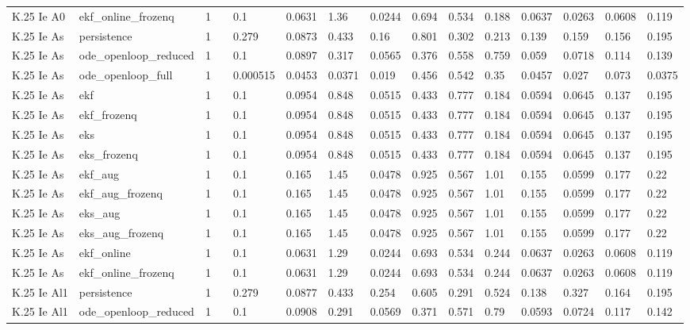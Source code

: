 \begin{table}[t]
\begin{tabular}{lllllllllllllll}
K.25 Ie A0 & ekf\_online\_frozenq & 1 &  & 0.1 & 0.0631 & 1.36 & 0.0244 & 0.694 & 0.534 & 0.188 & 0.0637 & 0.0263 & 0.0608 & 0.119 \\
K.25 Ie As & persistence & 1 &  & 0.279 & 0.0873 & 0.433 & 0.16 & 0.801 & 0.302 & 0.213 & 0.139 & 0.159 & 0.156 & 0.195 \\
K.25 Ie As & ode\_openloop\_reduced & 1 &  & 0.1 & 0.0897 & 0.317 & 0.0565 & 0.376 & 0.558 & 0.759 & 0.059 & 0.0718 & 0.114 & 0.139 \\
K.25 Ie As & ode\_openloop\_full & 1 &  & 0.000515 & 0.0453 & 0.0371 & 0.019 & 0.456 & 0.542 & 0.35 & 0.0457 & 0.027 & 0.073 & 0.0375 \\
K.25 Ie As & ekf & 1 &  & 0.1 & 0.0954 & 0.848 & 0.0515 & 0.433 & 0.777 & 0.184 & 0.0594 & 0.0645 & 0.137 & 0.195 \\
K.25 Ie As & ekf\_frozenq & 1 &  & 0.1 & 0.0954 & 0.848 & 0.0515 & 0.433 & 0.777 & 0.184 & 0.0594 & 0.0645 & 0.137 & 0.195 \\
K.25 Ie As & eks & 1 &  & 0.1 & 0.0954 & 0.848 & 0.0515 & 0.433 & 0.777 & 0.184 & 0.0594 & 0.0645 & 0.137 & 0.195 \\
K.25 Ie As & eks\_frozenq & 1 &  & 0.1 & 0.0954 & 0.848 & 0.0515 & 0.433 & 0.777 & 0.184 & 0.0594 & 0.0645 & 0.137 & 0.195 \\
K.25 Ie As & ekf\_aug & 1 &  & 0.1 & 0.165 & 1.45 & 0.0478 & 0.925 & 0.567 & 1.01 & 0.155 & 0.0599 & 0.177 & 0.22 \\
K.25 Ie As & ekf\_aug\_frozenq & 1 &  & 0.1 & 0.165 & 1.45 & 0.0478 & 0.925 & 0.567 & 1.01 & 0.155 & 0.0599 & 0.177 & 0.22 \\
K.25 Ie As & eks\_aug & 1 &  & 0.1 & 0.165 & 1.45 & 0.0478 & 0.925 & 0.567 & 1.01 & 0.155 & 0.0599 & 0.177 & 0.22 \\
K.25 Ie As & eks\_aug\_frozenq & 1 &  & 0.1 & 0.165 & 1.45 & 0.0478 & 0.925 & 0.567 & 1.01 & 0.155 & 0.0599 & 0.177 & 0.22 \\
K.25 Ie As & ekf\_online & 1 &  & 0.1 & 0.0631 & 1.29 & 0.0244 & 0.693 & 0.534 & 0.244 & 0.0637 & 0.0263 & 0.0608 & 0.119 \\
K.25 Ie As & ekf\_online\_frozenq & 1 &  & 0.1 & 0.0631 & 1.29 & 0.0244 & 0.693 & 0.534 & 0.244 & 0.0637 & 0.0263 & 0.0608 & 0.119 \\
K.25 Ie Al1 & persistence & 1 &  & 0.279 & 0.0877 & 0.433 & 0.254 & 0.605 & 0.291 & 0.524 & 0.138 & 0.327 & 0.164 & 0.195 \\
K.25 Ie Al1 & ode\_openloop\_reduced & 1 &  & 0.1 & 0.0908 & 0.291 & 0.0569 & 0.371 & 0.571 & 0.79 & 0.0593 & 0.0724 & 0.117 & 0.142 \\

\end{tabular}
\end{table}
